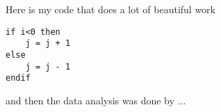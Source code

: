 \documentclass[a4paper]{article}
\begin{document}
Here is my code that does a lot of beautiful work

\begin{verbatim}
if i<0 then
	j = j + 1
else
	j = j - 1
endif
\end{verbatim}

and then the data analysis was done by ...
\end{document}
